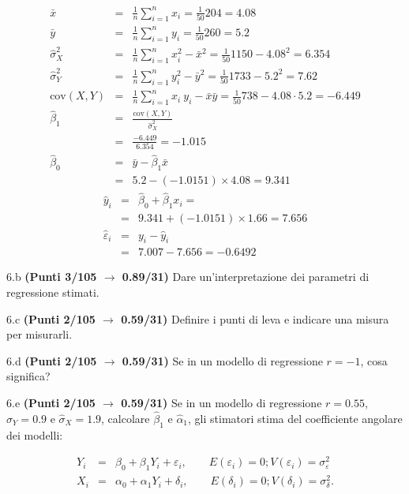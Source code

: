 \documentclass[
  11pt,
]{book}
\theoremstyle{mytheoremstyle}
\theoremstyle{mydefstyle}
\newenvironment{sol}
  {
  \begin{tcolorbox}[enhanced,breakable,arc=0.1mm,boxrule=1pt,colback=white,colframe=iblue,
  title=\bf \fontfamily{lmss}\selectfont \hspace{.5 cm} Soluzione,drop fuzzy shadow]

}{
\end{tcolorbox}
  }
\begin{document}
\begin{sol}
\begin{eqnarray*}
           \bar x &=&\frac 1 n\sum_{i=1}^n x_i = \frac {1}{ 50 }  204 =  4.08 \\
           \bar y &=&\frac 1 n\sum_{i=1}^n y_i = \frac {1}{ 50 }  260 =  5.2 \\
           \hat\sigma_X^2&=&\frac 1 n\sum_{i=1}^n x_i^2-\bar x^2=\frac {1}{ 50 }  1150  - 4.08 ^2= 6.354 \\
           \hat\sigma_Y^2&=&\frac 1 n\sum_{i=1}^n y_i^2-\bar y^2=\frac {1}{ 50 }  1733  - 5.2 ^2= 7.62 \\
           \text{cov}(X,Y)&=&\frac 1 n\sum_{i=1}^n x_i~y_i-\bar x\bar y=\frac {1}{ 50 }  738 - 4.08 \cdot 5.2 = -6.449 \\
           \hat\beta_1 &=& \frac{\text{cov}(X,Y)}{\hat\sigma_X^2} \\
                    &=& \frac{ -6.449 }{ 6.354 }  =  -1.015 \\
           \hat\beta_0 &=& \bar y - \hat\beta_1 \bar x\\
                    &=&  5.2 - (-1.0151) \times  4.08 = 9.341 
         \end{eqnarray*}\begin{eqnarray*}
\hat y_i &=&\hat\beta_0+\hat\beta_1 x_i=\\ 
&=& 9.341 + (-1.0151) \times 1.66 = 7.656 \\ 
\hat \varepsilon_i &=& y_i-\hat y_i\\ 
&=& 7.007 - 7.656 = -0.6492  
\end{eqnarray*}

\end{sol}

6.b \textbf{(Punti 3/105 \(\rightarrow\) 0.89/31)} Dare un'interpretazione dei parametri di regressione stimati.

6.c \textbf{(Punti 2/105 \(\rightarrow\) 0.59/31)} Definire i punti di leva e indicare una misura per misurarli.

6.d \textbf{(Punti 2/105 \(\rightarrow\) 0.59/31)} Se in un modello di regressione \(r=-1\), cosa significa?

6.e \textbf{(Punti 2/105 \(\rightarrow\) 0.59/31)} Se in un modello di regressione \(r=0.55\), \(\hat\sigma_Y=0.9\) e \(\hat\sigma_X=1.9\), calcolare \(\hat\beta_1\) e
\(\hat\alpha_1\), gli stimatori stima del coefficiente angolare dei modelli:

\begin{eqnarray*}
Y_i &=& \beta_0+\beta_1 Y_i + \varepsilon_i, \qquad E(\varepsilon_i)=0; V(\varepsilon_i)=\sigma_\varepsilon^2\\
X_i &=& \alpha_0+\alpha_1 Y_i + \delta_i, \qquad E(\delta_i)=0; V(\delta_i)=\sigma_\delta^2.
\end{eqnarray*}
\end{document}
